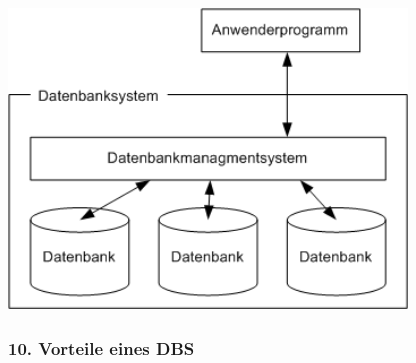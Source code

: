 \documentclass[
  11pt,
  a4paper,
  DIV=11,
  numbers=noendperiod]{scrartcl}
\begin{document}
\includegraphics[width=4.16667in,height=\textheight,keepaspectratio]{datenbanksystem.png}

\subsubsection{10. Vorteile eines DBS}\label{vorteile-eines-dbs}
\end{document}
